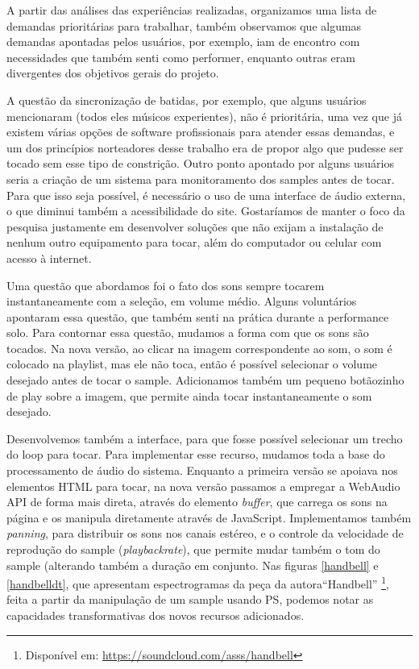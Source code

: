  A partir das análises das experiências realizadas, organizamos uma lista de demandas prioritárias para trabalhar, também observamos que algumas demandas apontadas pelos usuários, por exemplo, iam de encontro com necessidades que também senti como performer, enquanto outras eram divergentes dos objetivos gerais do projeto.

 A questão da sincronização de batidas, por exemplo, que alguns usuários mencionaram (todos eles músicos experientes), não é prioritária, uma vez que já existem várias opções de software profissionais para atender essas demandas, e um dos princípios norteadores desse trabalho era de propor algo que pudesse ser tocado sem esse tipo de constrição. Outro ponto apontado por alguns usuários seria a criação de um sistema para monitoramento dos samples antes de tocar. Para que isso seja possível, é necessário o uso de uma interface de áudio externa, o que diminui também a acessibilidade do site. Gostaríamos de manter o foco da pesquisa justamente em desenvolver soluções que não exijam a instalação de nenhum outro equipamento para tocar, além do computador ou celular com acesso à internet. 

 Uma questão que abordamos foi o fato dos sons sempre tocarem instantaneamente com a seleção, em volume médio. Alguns voluntários apontaram essa questão, que também senti na prática durante a performance solo. Para contornar essa questão, mudamos a forma com que os sons são tocados. Na nova versão, ao clicar na imagem correspondente ao som, o som é colocado na playlist, mas ele não toca, então é possível selecionar o volume desejado antes de tocar o sample. Adicionamos também um pequeno botãozinho de play sobre a imagem, que permite ainda tocar instantaneamente o som desejado.

 Desenvolvemos também a interface, para que fosse possível selecionar um trecho do loop para tocar. Para implementar esse recurso, mudamos toda a base do processamento de áudio do sistema. Enquanto a primeira versão se apoiava nos elementos HTML para tocar, na nova versão passamos a empregar a WebAudio API de forma mais direta, através do elemento \emph{buffer}, que carrega os sons na página e os manipula diretamente através de JavaScript. Implementamos também \emph{panning}, para distribuir os sons nos canais estéreo, e o controle da velocidade de reprodução do sample (\emph{playbackrate}), que permite mudar também o tom do sample (alterando também a duração em conjunto. Nas figuras \ref{handbell} e \ref{handbelldt}, que apresentam espectrogramas da peça da autora``Handbell'' \footnote{Disponível em: \url{https://soundcloud.com/asss/handbell}}, feita a partir da manipulação de um sample usando PS, podemos notar as capacidades transformativas dos novos recursos adicionados. 



